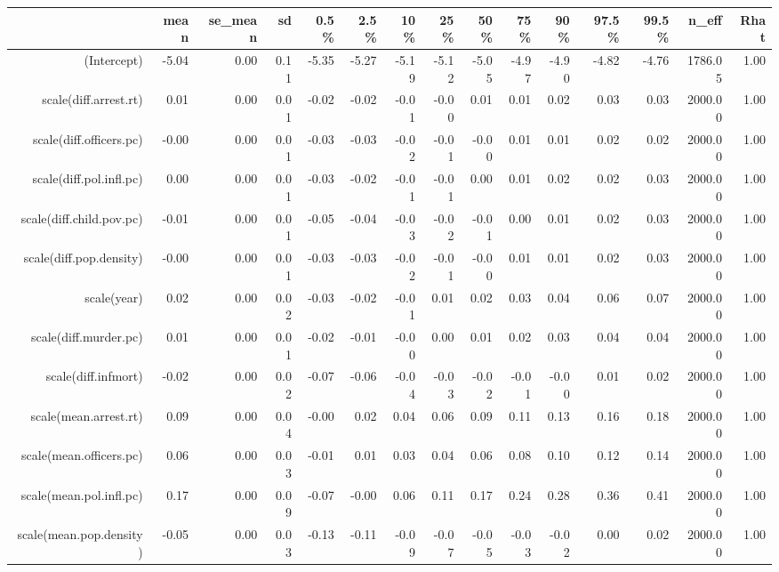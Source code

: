 \begin{table}[ht]
\centering
\begin{tabular}{rrrrrrrrrrrrrrr}
  \hline
 & mean & se\_mean & sd & 0.5\% & 2.5\% & 10\% & 25\% & 50\% & 75\% & 90\% & 97.5\% & 99.5\% & n\_eff & Rhat \\ 
  \hline
(Intercept) & -5.04 & 0.00 & 0.11 & -5.35 & -5.27 & -5.19 & -5.12 & -5.05 & -4.97 & -4.90 & -4.82 & -4.76 & 1786.05 & 1.00 \\ 
  scale(diff.arrest.rt) & 0.01 & 0.00 & 0.01 & -0.02 & -0.02 & -0.01 & -0.00 & 0.01 & 0.01 & 0.02 & 0.03 & 0.03 & 2000.00 & 1.00 \\ 
  scale(diff.officers.pc) & -0.00 & 0.00 & 0.01 & -0.03 & -0.03 & -0.02 & -0.01 & -0.00 & 0.01 & 0.01 & 0.02 & 0.02 & 2000.00 & 1.00 \\ 
  scale(diff.pol.infl.pc) & 0.00 & 0.00 & 0.01 & -0.03 & -0.02 & -0.01 & -0.01 & 0.00 & 0.01 & 0.02 & 0.02 & 0.03 & 2000.00 & 1.00 \\ 
  scale(diff.child.pov.pc) & -0.01 & 0.00 & 0.01 & -0.05 & -0.04 & -0.03 & -0.02 & -0.01 & 0.00 & 0.01 & 0.02 & 0.03 & 2000.00 & 1.00 \\ 
  scale(diff.pop.density) & -0.00 & 0.00 & 0.01 & -0.03 & -0.03 & -0.02 & -0.01 & -0.00 & 0.01 & 0.01 & 0.02 & 0.03 & 2000.00 & 1.00 \\ 
  scale(year) & 0.02 & 0.00 & 0.02 & -0.03 & -0.02 & -0.01 & 0.01 & 0.02 & 0.03 & 0.04 & 0.06 & 0.07 & 2000.00 & 1.00 \\ 
  scale(diff.murder.pc) & 0.01 & 0.00 & 0.01 & -0.02 & -0.01 & -0.00 & 0.00 & 0.01 & 0.02 & 0.03 & 0.04 & 0.04 & 2000.00 & 1.00 \\ 
  scale(diff.infmort) & -0.02 & 0.00 & 0.02 & -0.07 & -0.06 & -0.04 & -0.03 & -0.02 & -0.01 & -0.00 & 0.01 & 0.02 & 2000.00 & 1.00 \\ 
  scale(mean.arrest.rt) & 0.09 & 0.00 & 0.04 & -0.00 & 0.02 & 0.04 & 0.06 & 0.09 & 0.11 & 0.13 & 0.16 & 0.18 & 2000.00 & 1.00 \\ 
  scale(mean.officers.pc) & 0.06 & 0.00 & 0.03 & -0.01 & 0.01 & 0.03 & 0.04 & 0.06 & 0.08 & 0.10 & 0.12 & 0.14 & 2000.00 & 1.00 \\ 
  scale(mean.pol.infl.pc) & 0.17 & 0.00 & 0.09 & -0.07 & -0.00 & 0.06 & 0.11 & 0.17 & 0.24 & 0.28 & 0.36 & 0.41 & 2000.00 & 1.00 \\ 
  scale(mean.pop.density) & -0.05 & 0.00 & 0.03 & -0.13 & -0.11 & -0.09 & -0.07 & -0.05 & -0.03 & -0.02 & 0.00 & 0.02 & 2000.00 & 1.00 \\ 

\end{tabular}
\end{table}
